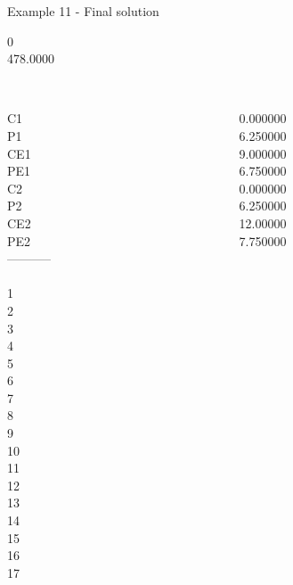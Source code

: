 \begin{frame}{Example 11 - Final solution}

  0\\
  478.0000\\

\begin{columns}[t]
\begin{column}{0.3\textwidth}
\\
C1\\
P1\\
CE1\\
PE1\\
C2\\
P2\\
CE2\\
PE2\\
-----------\\
\\
1\\
2\\
3\\
4\\
5\\
6\\
7\\
8\\
9\\
10\\
11\\
12\\
13\\
14\\
15\\
16\\
17\\

\end{column}
\begin{column}{0.3\textwidth}
\\
0.000000\\
6.250000\\
9.000000\\
6.750000\\
0.000000\\
6.250000\\
12.00000\\
7.750000\\


\end{column}
\end{columns}
\end{frame}

